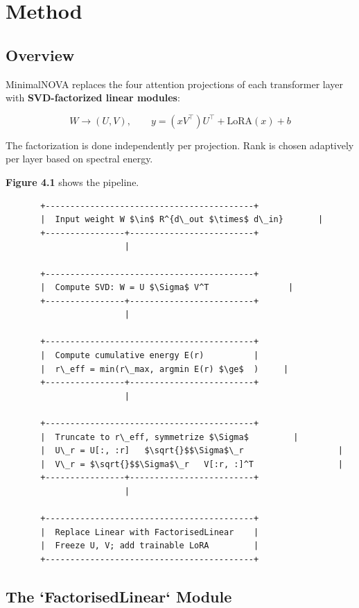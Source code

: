 
\section{Method}

\subsection{Overview}

MinimalNOVA replaces the four attention projections of each transformer layer 
with \textbf{SVD-factorized linear modules}:

\[
W \to (U, V), \qquad
y = (x V^\top) U^\top + \text{LoRA}(x) + b
\tag{4.1}
\]

The factorization is done independently per projection. Rank is chosen 
adaptively per layer based on spectral energy.

\textbf{Figure 4.1} shows the pipeline.

\begin{lstlisting}
       +------------------------------------------+
       |  Input weight W $\in$ R^{d\_out $\times$ d\_in}       |
       +----------------+-------------------------+
                        |
                         
       +------------------------------------------+
       |  Compute SVD: W = U $\Sigma$ V^T                |
       +----------------+-------------------------+
                        |
                         
       +------------------------------------------+
       |  Compute cumulative energy E(r)          |
       |  r\_eff = min(r\_max, argmin E(r) $\ge$  )     |
       +----------------+-------------------------+
                        |
                         
       +------------------------------------------+
       |  Truncate to r\_eff, symmetrize $\Sigma$         |
       |  U\_r = U[:, :r]   $\sqrt{}$$\Sigma$\_r                   |
       |  V\_r = $\sqrt{}$$\Sigma$\_r   V[:r, :]^T                 |
       +----------------+-------------------------+
                        |
                         
       +------------------------------------------+
       |  Replace Linear with FactorisedLinear    |
       |  Freeze U, V; add trainable LoRA         |
       +------------------------------------------+
\end{lstlisting}

\subsection{The `FactorisedLinear` Module}

